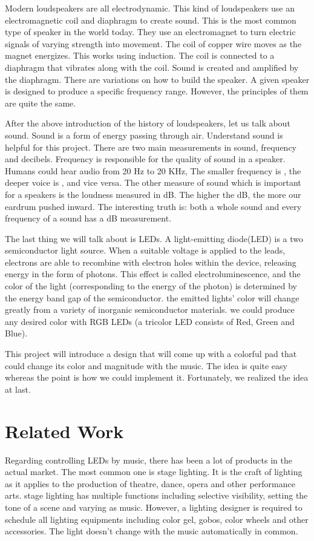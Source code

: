 \documentclass[12pt,a4paper,journal]{IEEEtran}
\begin{document}
Modern loudspeakers are all electrodynamic. This kind of loudspeakers use an electromagnetic coil and diaphragm to create sound. This is the most common type of speaker in the world today. They use an electromagnet to turn electric signals of varying strength into movement. The coil of copper wire moves as the magnet energizes. This works using induction. The coil is connected to a diaphragm that vibrates along with the coil. Sound is created and amplified by the diaphragm. There are variations on how to build the speaker. A given speaker is designed to produce a specific frequency range. However, the principles of them are quite the same.

After the above introduction of the history of loudspeakers, let us talk about sound. Sound is a form of energy passing through air. Understand sound is helpful for this project. There are two main measurements in sound, frequency and decibels. Frequency is responsible for the quality of sound in a speaker. Humans could hear audio from 20 Hz to 20 KHz, The smaller frequency is , the deeper voice is , and vice versa. The other measure of sound which is important for a speakers is the loudness measured in dB. The higher the dB, the more our eardrum pushed inward. The interesting truth is: both a whole sound and every frequency of a sound has a dB measurement.

The last thing we will talk about is LEDs. A light-emitting diode(LED) is a two semiconductor light source. When a suitable voltage is applied to the leads, electrons are able to recombine with electron holes within the device, releasing energy in the form of photons. This effect is called electroluminescence, and the color of the light (corresponding to the energy of the photon) is determined by the energy band gap of the semiconductor. the emitted lights' color will change greatly from a variety of inorganic semiconductor materials. we could produce any desired color with RGB LEDs (a tricolor LED consists of Red, Green and Blue).

This project will introduce a design that will come up with a colorful pad that could change its color and magnitude with the music. The idea is quite easy whereas the point is how we could implement it. Fortunately, we realized the idea at last.

\section{Related Work}

Regarding controlling LEDs by music, there has been a lot of products in the actual market. The most common one is stage lighting. It is the craft of lighting as it applies to the production of theatre, dance, opera and other performance arts. stage lighting has multiple functions including selective visibility, setting the tone of a scene and varying as music.  However, a lighting designer is required to schedule all lighting equipments including color gel, gobos, color wheels and other accessories. The light doesn't change with the music automatically in common. 
\end{document}
